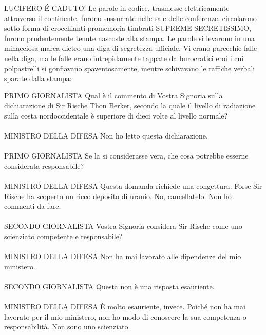	LUCIFERO É CADUTO! Le parole in codice, trasmesse elettricamente
	attraverso il continente, furono sussurrate nelle sale delle conferenze,
	circolarono sotto forma di crocchianti promemoria timbrati SUPREME
	SECRETISSIMO, furono prudentemente tenute nascoste alla stampa. Le
	parole si levarono in una minacciosa marea dietro una diga di segretezza
	ufficiale. Vi erano parecchie falle nella diga, ma le falle erano
	intrepidamente tappate da burocratici eroi i cui polpastrelli si
	gonfiavano spaventosamente, mentre schivavano le raffiche verbali
	sparate dalla stampa:
	
	{\begin{flushleft}
			PRIMO GIORNALISTA Qual è il commento di Vostra Signoria sulla
			dichiarazione di Sir Rische Thon Berker, secondo la quale il livello di
			radiazione sulla costa nordoccidentale è superiore di dieci volte al
			livello normale?
			\leavevmode\\
			\leavevmode\\
			MINISTRO DELLA DIFESA Non ho letto questa dichiarazione.
			\leavevmode\\
			\leavevmode\\
			PRIMO GIORNALISTA Se la si considerasse vera, che cosa potrebbe esserne
			considerata responsabile?
			\leavevmode\\
			\leavevmode\\
			MINISTRO DELLA DIFESA Questa domanda richiede una congettura. Forse Sir
			Rische ha scoperto un ricco deposito di uranio. No, cancellatelo. Non ho
			commenti da fare.
			\leavevmode\\
			\leavevmode\\
			SECONDO GIORNALISTA Vostra Signoria considera Sir Rische come uno
			scienziato competente e responsabile?
			\leavevmode\\
			\leavevmode\\
			MINISTRO DELLA DIFESA Non ha mai lavorato alle dipendenze del mio
			ministero.
			\leavevmode\\
			\leavevmode\\
			SECONDO GIORNALISTA Questa non è una risposta esauriente.
			\leavevmode\\
			\leavevmode\\
			MINISTRO DELLA DIFESA È molto esauriente, invece. Poiché non ha mai
			lavorato per il mio ministero, non ho modo di conoscere la sua
			competenza o responsabilità. Non sono uno scienziato.
			\leavevmode\\
			\leavevmode\\

\end{flushleft}}
